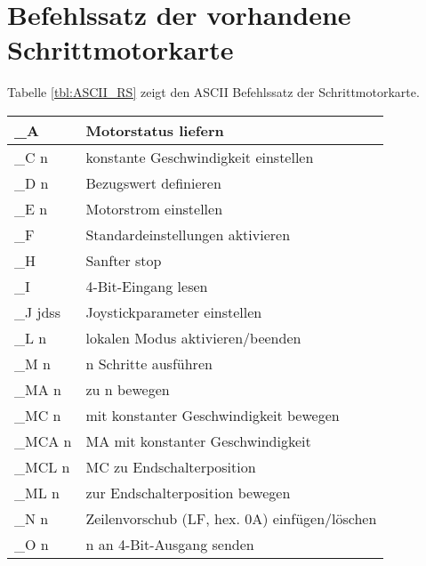 \section{Befehlssatz der vorhandene Schrittmotorkarte}
Tabelle \ref{tbl:ASCII_RS} zeigt den ASCII Befehlssatz der Schrittmotorkarte.
\label{sec:A_ASCII_Befehle}

\begin{table}[htb]
\begin{tabular}{|l|l|}	\hline 
\rule[-1ex]{0pt}{2.5ex} \_A 		& Motorstatus liefern                          \\ \hline 
\rule[-1ex]{0pt}{2.5ex} \_C n		& konstante Geschwindigkeit einstellen         \\ \hline 
\rule[-1ex]{0pt}{2.5ex} \_D n 		& Bezugswert definieren                        \\ \hline 
\rule[-1ex]{0pt}{2.5ex} \_E n		& Motorstrom einstellen                        \\ \hline 
\rule[-1ex]{0pt}{2.5ex} \_F 		& Standardeinstellungen aktivieren             \\ \hline 
\rule[-1ex]{0pt}{2.5ex} \_H 		& Sanfter stop                                 \\ \hline 
\rule[-1ex]{0pt}{2.5ex} \_I 		& 4-Bit-Eingang lesen                          \\ \hline 
\rule[-1ex]{0pt}{2.5ex} \_J jdss 	& Joystickparameter einstellen                 \\ \hline 
\rule[-1ex]{0pt}{2.5ex} \_L n 		& lokalen Modus aktivieren/beenden             \\ \hline 
\rule[-1ex]{0pt}{2.5ex} \_M n 		& n Schritte ausführen                         \\ \hline 
\rule[-1ex]{0pt}{2.5ex} \_MA n 		& zu n bewegen                                 \\ \hline 
\rule[-1ex]{0pt}{2.5ex} \_MC n 		& mit konstanter Geschwindigkeit bewegen       \\ \hline 
\rule[-1ex]{0pt}{2.5ex} \_MCA n 	& MA mit konstanter Geschwindigkeit            \\ \hline 
\rule[-1ex]{0pt}{2.5ex} \_MCL n 	& MC zu Endschalterposition                    \\ \hline 
\rule[-1ex]{0pt}{2.5ex} \_ML n 		& zur Endschalterposition bewegen              \\ \hline 
\rule[-1ex]{0pt}{2.5ex} \_N n 		& Zeilenvorschub (LF, hex. 0A) einfügen/löschen\\ \hline 
\rule[-1ex]{0pt}{2.5ex} \_O n 		& n an 4-Bit-Ausgang senden                    \\ \hline 

\end{tabular}
\end{table}
